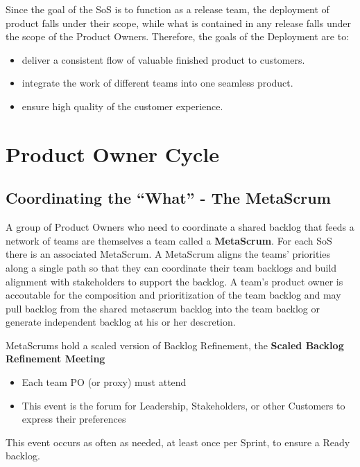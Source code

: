 \documentclass[12pt,a4paper,parskip=full]{scrartcl}
\begin{document}
Since the goal of the SoS is to function as a release team, the deployment
of product falls under their scope, while what is contained in any release
falls under the scope of the Product Owners. Therefore, the goals of the
Deployment are to:
\begin{itemize}
\item deliver a consistent flow of valuable finished product to customers.
\item integrate the work of different teams into one seamless product.
\item ensure high quality of the customer experience.
\end{itemize}

\section{Product Owner Cycle}
\subsection{Coordinating the ``What'' - The MetaScrum}
A group of Product Owners who need to coordinate a shared backlog that
feeds a network of teams are themselves a team called a \textbf{MetaScrum}.
For each SoS there is an associated MetaScrum. A MetaScrum aligns the
teams' priorities along a single path so that they can coordinate their
team backlogs and build alignment with stakeholders to support the backlog.
A team's product owner is accoutable for the composition and prioritization
of the team backlog and may pull backlog from the shared metascrum backlog
into the team backlog or generate independent backlog at his or her descretion.

MetaScrums hold a scaled version of Backlog Refinement, the \textbf{Scaled Backlog Refinement Meeting} 
\begin{itemize}
\item Each team PO (or proxy) must attend
\item This event is the forum for Leadership, Stakeholders, or other
Customers to express their preferences
\end{itemize}
This event occurs as often as needed, at least once per Sprint, to ensure a
Ready backlog. 
\end{document}
